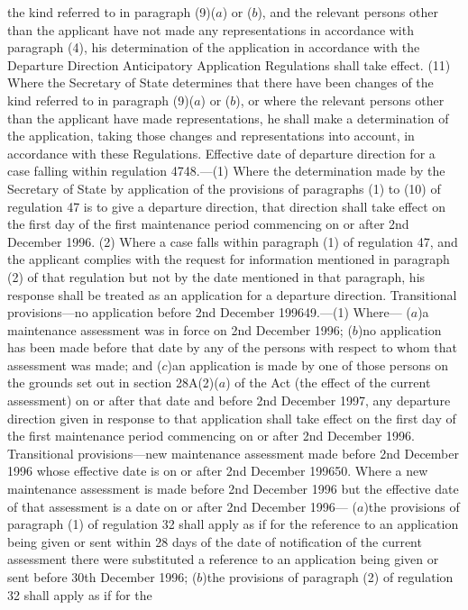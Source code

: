 \documentclass[a4paper]{article}
\begin{document}
the kind referred to in paragraph (9)($a$) or ($b$), and the relevant persons other
than the applicant have not made any representations in accordance with
paragraph (4), his determination of the application in accordance with the
Departure Direction Anticipatory Application Regulations shall take effect.
(11) Where the Secretary of State determines that there have been changes of the
kind referred to in paragraph (9)($a$) or ($b$), or where the relevant persons other
than the applicant have made representations, he shall make a determination of
the application, taking those changes and representations into account, in
accordance with these Regulations.
Effective date of departure direction for a case falling within regulation
4748.—(1) Where the determination made by the Secretary of State by application
of the provisions of paragraphs (1) to (10) of regulation 47 is to give a
departure direction, that direction shall take effect on the first day of the
first maintenance period commencing on or after 2nd December 1996.
(2) Where a case falls within paragraph (1) of regulation 47, and the applicant
complies with the request for information mentioned in paragraph (2) of that
regulation but not by the date mentioned in that paragraph, his response shall
be treated as an application for a departure direction.
Transitional provisions—no application before 2nd December 199649.—(1) Where—
($a$)a maintenance assessment was in force on 2nd December 1996;
($b$)no application has been made before that date by any of the persons with
respect to whom that assessment was made; and
($c$)an application is made by one of those persons on the grounds set out in
section 28A(2)($a$) of the Act (the effect of the current assessment) on or after
that date and before 2nd December 1997,
any departure direction given in response to that application shall take effect
on the first day of the first maintenance period commencing on or after 2nd
December 1996.
Transitional provisions—new maintenance assessment made before 2nd December 1996
whose effective date is on or after 2nd December 199650. Where a new maintenance
assessment is made before 2nd December 1996 but the effective date of that
assessment is a date on or after 2nd December 1996—
($a$)the provisions of paragraph (1) of regulation 32 shall apply as if for the
reference to an application being given or sent within 28 days of the date of
notification of the current assessment there were substituted a reference to an
application being given or sent before 30th December 1996;
($b$)the provisions of paragraph (2) of regulation 32 shall apply as if for the
\end{document}
